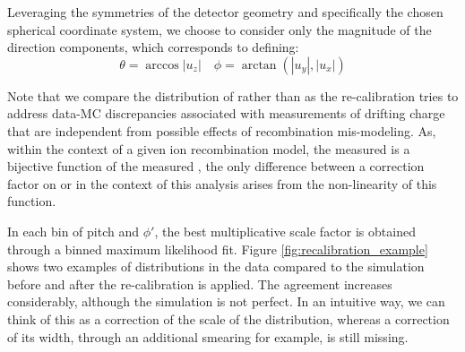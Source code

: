 Leveraging the symmetries of the detector geometry and specifically the chosen spherical coordinate system, we choose to consider only the magnitude of the direction components, which corresponds to defining:
\[ \theta = \arccos{|u_z|} \quad \phi = \arctan{(|u_y|, |u_x|)} \]

Note that we compare the distribution of \dqdx rather than \dedx as the re-calibration tries to address data-MC discrepancies associated with measurements of drifting charge that are independent from possible effects of recombination mis-modeling.
As, within the context of a given ion recombination model, the measured \dedx is a bijective function of the measured \dqdx, the only difference between a correction factor on \dqdx or \dedx in the context of this analysis arises from the non-linearity of this function.

In each bin of pitch and $\phi'$, the best multiplicative scale factor is obtained through a binned maximum likelihood fit.
Figure \ref{fig:recalibration_example} shows two examples of \dqdx distributions in the data compared to the simulation before and after the re-calibration is applied.
The agreement increases considerably, although the simulation is not perfect.
In an intuitive way, we can think of this as a correction of the scale of the distribution, whereas a correction of its width, through an additional smearing for example, is still missing.

